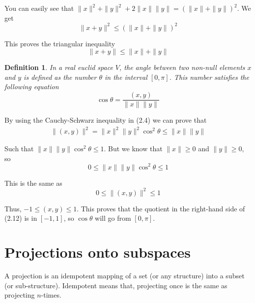\documentclass{book}
\newtheorem{definition}{Definition}[chapter]
\begin{document}
You can easily see that $\|x\|^{2} + \|y\|^{2} + 2\|x\|\|y\| =
    (\|x\|+\|y\|)^{2}$. We get
\begin{equation}
    \|x+y\|^{2} \leq (\|x\|+\|y\|)^{2}
\end{equation}

This proves the triangular inequality
\begin{equation*}
    \|x+y\| \leq \|x\|+\|y\|
\end{equation*}

\begin{definition}
    In a real euclid space $V$, the angle between two non-null elements $x$ and $y$ is defined as the number $\theta$
    in the interval $\left[0,\pi\right]$. This number satisfies the following equation
    \begin{equation}
        \cos\theta = \dfrac{\left(x,y\right)}{\|x\|\|y\|}
    \end{equation}
\end{definition}

By using the Cauchy-Schwarz inequality in (2.4) we can prove that
\begin{equation*}
    \begin{split}
        \|(x,y)\|^{2} = \|x\|^{2}\|y\|^{2}\cos^{2}\theta \leq \|x\|\|y\|
    \end{split}
\end{equation*}

Such that $\|x\|\|y\|\cos^{2}\theta \leq 1$. But we know that $\|x\|\geq 0$ and
$\|y\|\geq 0$, so
\begin{equation*}
    0 \leq \|x\|\|y\|\cos^{2}\theta \leq 1
\end{equation*}

This is the same as
\begin{equation*}
    0 \leq \|(x,y)\|^{2} \leq 1
\end{equation*}

Thus, $-1 \leq (x,y) \leq 1$. This proves that the quotient in the right-hand
side of (2.12) is in $[-1,1]$, so $\cos\theta$ will go from $[0,\pi]$.

\chapter{Projections onto subspaces}

A projection is an idempotent mapping of a set (or any structure) into a subset
(or sub-structure). Idempotent means that, projecting once is the same as
projecting $n$-times.
\end{document}
